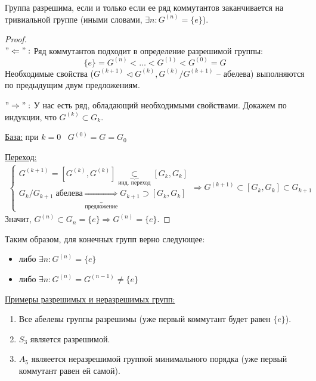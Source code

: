 \begin{theorem-non}
    Группа разрешима, если и только если ее ряд коммутантов заканчивается на тривиальной группе (иными словами, $\exists n : G^{(n)} = \{e\}$).
\end{theorem-non}
\begin{proof} \quad \\
     $"\Leftarrow":$ Ряд коммутантов подходит в определение разрешимой группы:
     \[ \{e\} = G^{(n)} < \dots < G^{(1)} < G^{(0)} = G \]
     Необходимые свойства ($G^{(k + 1)} \lhd G^{(k)}, G^{(k)} / G^{(k + 1)}$ -- абелева) выполняются по предыдущим двум предложениям.
    
     $"\Rightarrow":$ У нас есть ряд, обладающий необходимыми свойствами.
     Докажем по индукции, что $G^{(k)} \subset G_k$.

     \quad \underline{База:} при $k = 0 \;\;\; G^{(0)} = G = G_0$

     \quad \underline{Переход:}
     \begin{gather*}
        \begin{cases}
            G^{(k + 1)} = [G^{(k)}, G^{(k)}] \underbrace{\subset}_{\text{инд. переход}} [G_k, G_k] \\
            G_k / G_{k + 1} \; \text{абелева} \underbrace{\Rightarrow}_{\text{предложение}} G_{k + 1} \supset [G_k, G_k]
           \end{cases} \Rightarrow G^{(k + 1)} \subset [G_k, G_k] \subset G_{k + 1}
     \end{gather*}
    Значит, $G^{(n)} \subset G_n = \{e\} \Rightarrow G^{(n)} = \{e\}$.
\end{proof}
Таким образом, для конечных групп верно следующее:
\begin{itemize}
    \item либо $\exists n : G^{(n)} = \{e\}$
    \item либо $\exists n : G^{(n)} = G^{(n - 1)} \neq \{e\}$
\end{itemize}

\underline{Примеры разрешимых и неразрешимых групп:}
\begin{enumerate}
    \item Все абелевы группы разрешимы (уже первый коммутант будет равен $\{e\}$).
    \item $S_3$ является разрешимой.
    \item $A_5$ являеется неразрешимой группой минимального порядка (уже первый коммутант равен ей самой).
\end{enumerate}

